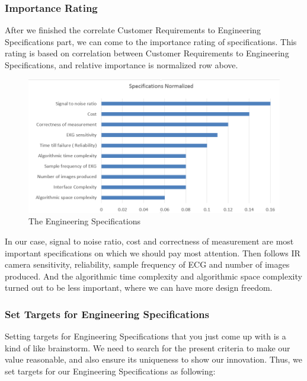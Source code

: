 \documentclass[paper=letter, fontsize=11pt]{scrartcl}
\numberwithin{equation}{section}		%
\numberwithin{figure}{section}			%
\numberwithin{table}{section}			%
\begin{document}
\subsubsection{Importance Rating}
After we finished the correlate Customer Requirements to Engineering Specifications part, we can come to the importance rating of specifications. This rating is based on correlation between Customer Requirements to Engineering Specifications, and relative importance is normalized row above. 

\begin{figure}[H]
    \centering
	\includegraphics[scale=0.7]{engineering_specifications.png}
	\caption{The Engineering Specifications}
\end{figure}

In our case, signal to noise ratio, cost and correctness of measurement are most important specifications on which we should pay most attention. Then follows IR camera sensitivity, reliability, sample frequency of ECG and number of images produced. And the algorithmic time complexity and algorithmic space complexity turned out to be less important, where we can have more design freedom.
\subsubsection{Set Targets for Engineering Specifications}
Setting targets for Engineering Specifications that you just come up with is a kind of like brainstorm. We need to search for the present criteria to make our value reasonable, and also ensure its uniqueness to show our innovation. Thus, we set targets for our Engineering Specifications as following:
\end{document}
